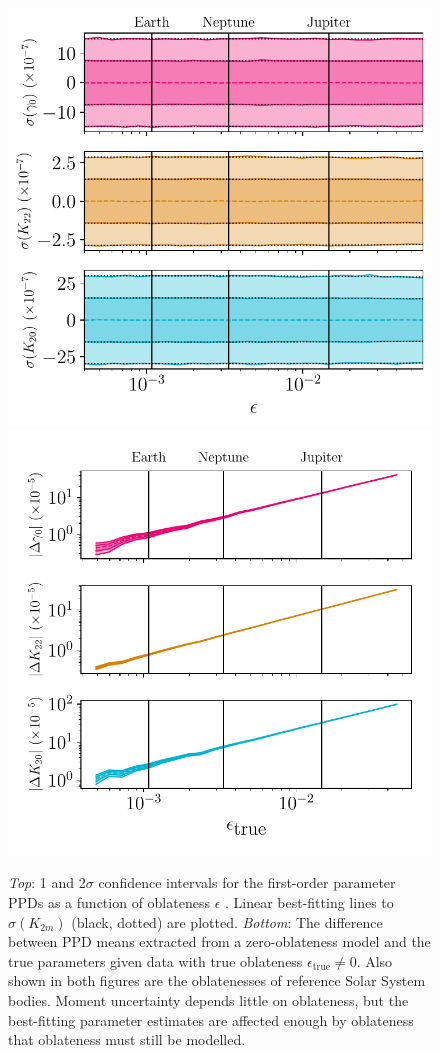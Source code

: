 \documentclass[fleqn,usenatbib]{mnras}
\begin{document}
\begin{figure}
  \centering
  \includegraphics[width=0.7\columnwidth]{figs/oblateness.pdf}
  \vfill
  \includegraphics[width=0.7\columnwidth]{figs/oblateness-differ.pdf}
  \caption{\textit{Top}: 1 and 2$\sigma$ confidence intervals for the first-order parameter PPDs as a function of oblateness $\epsilon$ . Linear best-fitting lines to $\sigma(K_{2m})$ (black, dotted) are plotted. \textit{Bottom}: The difference between PPD means extracted from a zero-oblateness model and the true parameters given data with true oblateness $\epsilon_\text{true} \neq 0$. Also shown in both figures are the oblatenesses of reference Solar System bodies. Moment uncertainty depends little on oblateness, but the best-fitting parameter estimates are affected enough by oblateness that oblateness must still be modelled.}
  \label{fig:scan-oblateness}
\end{figure}
\end{document}
